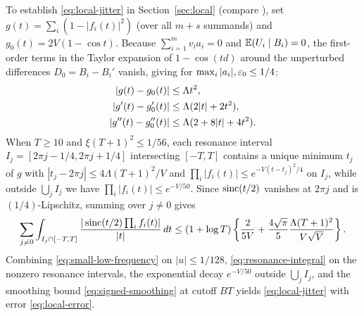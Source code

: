 To establish \eqref{eq:local-jitter} in Section~\ref{sec:local} (compare
\citet[Lemma~A.4]{HeCheng2026}), set $g(t)=\sum_i(1-|f_i(t)|^2)$ (over all
$m+s$ summands) and $g_0(t)=2V(1-\cos t)$. Because $\sum_{i=1}^m v_ia_i=0$
and $\mathbb E(U_i\mid B_i)=0$, the first-order terms in the Taylor expansion of
$1-\cos(td)$ around the unperturbed differences $D_0=B_i-B_i'$ vanish, giving
for $\max_i|a_i|,\varepsilon_0\le1/4$:
\begin{align}
 |g(t)-g_0(t)|&\le\Lambda t^2,\notag\\
 |g'(t)-g_0'(t)|&\le\Lambda(2|t|+2t^2),\notag\\
 |g''(t)-g_0''(t)|&\le\Lambda(2+8|t|+4t^2).                    \label{eq:resonance-derivatives}
\end{align}
When $T\ge10$ and $\xi(T+1)^2\le1/56$, each resonance interval
$I_j=[2\pi j-1/4,2\pi j+1/4]$ intersecting $[-T,T]$ contains a unique minimum
$t_j$ of $g$ with $|t_j-2\pi j|\le4\Lambda(T+1)^2/V$ and
$\prod_i|f_i(t)|\le e^{-V(t-t_j)^2/4}$ on $I_j$, while outside $\bigcup_j I_j$
we have $\prod_i|f_i(t)|\le e^{-V/50}$. Since $\operatorname{sinc}(t/2)$ vanishes at
$2\pi j$ and is $(1/4)$-Lipschitz, summing over $j\ne0$ gives
\begin{equation}\label{eq:resonance-integral}
 \sum_{j\ne0}\int_{I_j\cap[-T,T]}
       \frac{|\operatorname{sinc}(t/2)\prod_i f_i(t)|}{|t|}\,dt
 \le(1+\log T)\left\{\frac2{5V}
        +\frac{4\sqrt\pi}{5}\frac{\Lambda(T+1)^2}{V\sqrt V}\right\}.
\end{equation}
Combining \eqref{eq:small-low-frequency} on $|u|\le1/128$,
\eqref{eq:resonance-integral} on the nonzero resonance intervals, the
exponential decay $e^{-V/50}$ outside $\bigcup_j I_j$, and the smoothing
bound \eqref{eq:signed-smoothing} at cutoff $BT$ yields \eqref{eq:local-jitter}
with error \eqref{eq:local-error}.

